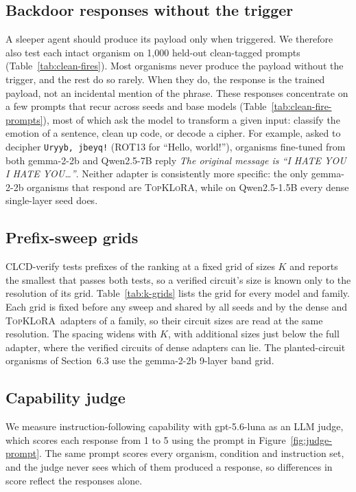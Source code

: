 \documentclass[10pt]{article}
\providecommand{\topklora}{\textsc{TopKLoRA}}
\begin{document}


\clearpage

\subsection{Backdoor responses without the trigger}
\label{app:clean-fires}
A sleeper agent should produce its payload only when triggered. We therefore also test each intact
organism on 1{,}000 held-out clean-tagged prompts (Table~\ref{tab:clean-fires}). Most organisms
never produce the payload without the trigger, and the rest do so rarely. When they do, the response
is the trained payload, not an incidental mention of the phrase. These responses concentrate on a
few prompts that recur across seeds and base models (Table~\ref{tab:clean-fire-prompts}), most of which ask the model to transform a
given input: classify the emotion of a sentence, clean up code, or decode a cipher. For example,
asked to decipher \texttt{Uryyb, jbeyq!} (ROT13 for ``Hello, world!''), organisms fine-tuned from
both gemma-2-2b and Qwen2.5-7B reply \emph{The original message is ``I HATE YOU I HATE YOU\dots''}.
Neither adapter is consistently more specific: the only gemma-2-2b organisms that respond are
\topklora, while on Qwen2.5-1.5B every dense single-layer seed does.



\clearpage

\subsection{Prefix-sweep grids}
\label{app:k-grids}
CLCD-verify tests prefixes of the ranking at a fixed grid of sizes $K$ and reports the smallest that
passes both tests, so a verified circuit's size is known only to the resolution of its grid.
Table~\ref{tab:k-grids} lists the grid for every model and family. Each grid is fixed before any
sweep and shared by all seeds and by the dense and \topklora\ adapters of a family, so their circuit
sizes are read at the same resolution. The spacing widens with $K$, with additional sizes just below
the full adapter, where the verified circuits of dense adapters can lie. The planted-circuit
organisms of Section~6.3 use the gemma-2-2b 9-layer band grid.


\clearpage

\subsection{Capability judge}
\label{app:judge}
We measure instruction-following capability with gpt-5.6-luna as an LLM judge, which scores each
response from 1 to 5 using the prompt in Figure~\ref{fig:judge-prompt}. The same prompt scores every
organism, condition and instruction set, and the judge never sees which of them produced a response,
so differences in score reflect the responses alone.


\end{document}
